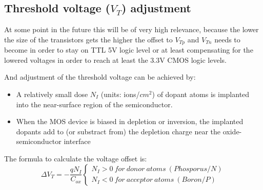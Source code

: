 \subsection{Threshold voltage ($V_T$) adjustment}
At some point in the future this will be of very high relevance, because the lower the size of the transistors gets the higher the offset to $V_{Tp}$ and $V_{Tn}$ needs to become in order to stay on TTL 5V logic level or at least compensating for the lowered voltages in order to reach at least the 3.3V CMOS logic levels.

And adjustment of the threshold voltage can be achieved by:
\begin{itemize}
\item A relatively small dose $N_I$ (units: ions/$cm^2$) of dopant atoms is implanted into the near-surface  region of the semiconductor.
\item When the MOS device is biased in depletion or inversion, the implanted dopants add to (or substract from) the depletion charge near the oxide-semiconductor interface
\end{itemize}

The formula to calculate the voltage offset is:
\begin{equation}
\Delta V_T = -\frac{q N_I}{C_{ox}} 
\left\{\begin{matrix}
N_I > 0\ for\ donor\ atoms\ (Phosporus/N) \\
N_I < 0\ for\ acceptor\ atoms\ (Boron/P)
\end{matrix}\right.
\end{equation}